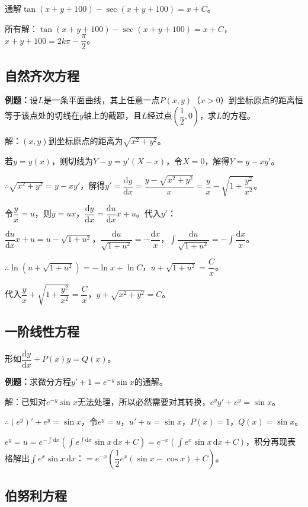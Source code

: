 \documentclass[UTF8, 12pt]{ctexart}
\begin{document}
通解$\tan(x+y+100)-\sec(x+y+100)=x+C$。

所有解：$\tan(x+y+100)-\sec(x+y+100)=x+C$，$x+y+100=2k\pi-\dfrac{\pi}{2}$。

\subsection{自然齐次方程}

\textbf{例题：}设$L$是一条平面曲线，其上任意一点$P(x,y)$（$x>0$）到坐标原点的距离恒等于该点处的切线在$y$轴上的截距，且$L$经过点$\left(\dfrac{1}{2},0\right)$，求$L$的方程。

解：$(x,y)$到坐标原点的距离为$\sqrt{x^2+y^2}$。

若$y=y(x)$，则切线为$Y-y=y'(X-x)$，令$X=0$，解得$Y=y-xy'$。

$\therefore\sqrt{x^2+y^2}=y-xy'$，解得$y'=\dfrac{\textrm{d}y}{\textrm{d}x}=\dfrac{y-\sqrt{x^2+y^2}}{x}=\dfrac{y}{x}-\sqrt{1+\dfrac{y^2}{x^2}}$。

令$\dfrac{y}{x}=u$，则$y=ux$，$\dfrac{\textrm{d}y}{\textrm{d}x}=\dfrac{\textrm{d}u}{\textrm{d}x}x+u$。代入$y'$：

$\dfrac{\textrm{d}u}{\textrm{d}x}x+u=u-\sqrt{1+u^2}$，$\dfrac{\textrm{d}u}{\sqrt{1+u^2}}=-\dfrac{\textrm{d}x}{x}$，$\displaystyle{\int\dfrac{\textrm{d}u}{\sqrt{1+u^2}}=-\int\dfrac{\textrm{d}x}{x}}$。

$\therefore\ln(u+\sqrt{1+u^2})=-\ln x+\ln C$，$u+\sqrt{1+u^2}=\dfrac{C}{x}$。

代入$\dfrac{y}{x}+\sqrt{1+\dfrac{y^2}{x^2}}=\dfrac{C}{x}$，$y+\sqrt{x^2+y^2}=C$。

\subsection{一阶线性方程}

形如$\dfrac{\textrm{d}y}{\textrm{d}x}+P(x)y=Q(x)$。

\textbf{例题：}求微分方程$y'+1=e^{-y}\sin x$的通解。

解：已知对$e^{-y}\sin x$无法处理，所以必然需要对其转换，$e^yy'+e^y=\sin x$。

$\therefore(e^y)'+e^y=\sin x$，令$e^y=u$，$u'+u=\sin x$，$P(x)=1$，$Q(x)=\sin x$。

$e^y=u=e^{-\int\textrm{d}x}(\int e^{\int\textrm{d}x}\sin x\,\textrm{d}x+C)=e^{-x}(\int e^x\sin x\,\textrm{d}x+C)$，积分再现表格解出$\int e^x\sin x\,\textrm{d}x$：$=e^{-x}\left(\dfrac{1}{2}e^x(\sin x-\cos x)+C\right)$。

\subsection{伯努利方程}
\end{document}

